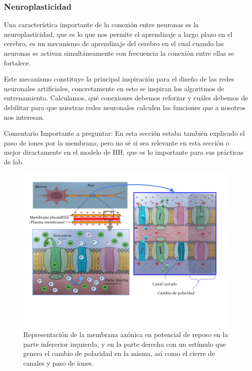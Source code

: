 \subsubsection{Neuroplasticidad}

Una característica importante de la conexión entre neuronas es la neuroplasticidad, que es lo que nos permite el aprendizaje a largo plazo en el cerebro, es un mecanismo de aprendizaje del cerebro en el cual cuando las neuronas se activan simultáneamente con frecuencia la conexión entre ellas se fortalece.


Este mecanismo constituye la principal inspiración para el diseño de las redes neuronales artificiales, concretamente en esto se inspiran los algoritmos de entrenamiento. Calculamos, qué conexiones debemos reforzar y cuáles debemos de debilitar para que nuestras redes neuronales calculen las funciones que a nosotros nos interesan.


Comentario Importante a preguntar:
En esta sección estaba también explicado el paso de iones por la membrana, pero no sé si sea relevante en esta sección o mejor diractamente en el modelo de HH, que es lo importante para sus prácticas de lab.

\begin{figure}[h]
 \centering
 \includegraphics[scale=0.5]{../Figuras/MembranaP.png}
 \caption{Representación de la membrana axónica en potencial de reposo en la parte infererior izquierda, y en la parte derecha con un estímulo que genera el cambio de polaridad en la misma, así como el cierre de canales y paso de iones.}
 \label{fig:MembranaP}
\end{figure}









